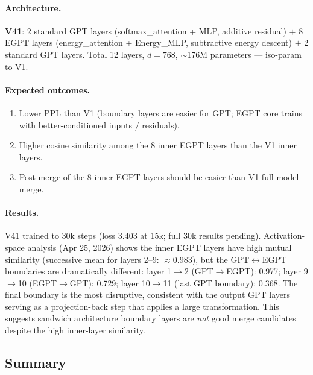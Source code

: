 \paragraph{Architecture.}
\textbf{V41}: 2 standard GPT layers (softmax\_attention + MLP, additive residual) $+$ 8
EGPT layers (energy\_attention + Energy\_MLP, subtractive energy descent) $+$ 2 standard GPT
layers.  Total 12 layers, $d{=}768$, $\sim$176M parameters --- iso-param to V1.

\paragraph{Expected outcomes.}
\begin{enumerate}
  \item Lower PPL than V1 (boundary layers are easier for GPT; EGPT core trains with
        better-conditioned inputs / residuals).
  \item Higher cosine similarity among the 8 inner EGPT layers than the V1 inner layers.
  \item Post-merge of the 8 inner EGPT layers should be easier than V1 full-model merge.
\end{enumerate}

\paragraph{Results.}
V41 trained to 30k steps (loss 3.403 at 15k; full 30k results pending).
Activation-space analysis (Apr 25, 2026) shows the inner EGPT layers have
high mutual similarity (successive mean for layers 2--9: $\approx$0.983),
but the GPT$\leftrightarrow$EGPT boundaries are dramatically different:
layer 1$\to$2 (GPT$\to$EGPT): 0.977; layer 9$\to$10 (EGPT$\to$GPT): 0.729;
layer 10$\to$11 (last GPT boundary): 0.368.
The final boundary is the most disruptive, consistent with the output GPT layers
serving as a projection-back step that applies a large transformation.
This suggests sandwich architecture boundary layers are \emph{not} good merge candidates
despite the high inner-layer similarity.

\subsection{Summary}

